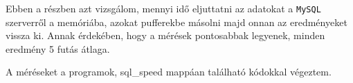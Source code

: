 


Ebben a részben azt vizsgálom, mennyi idő eljuttatni az adatokat a \texttt{MySQL} szerverről a memóriába, azokat pufferekbe másolni majd onnan az eredményeket vissza ki.
Annak érdekében, hogy a mérések pontosabbak legyenek, minden eredmény 5 futás átlaga.


A méréseket a programok, sql\_speed mappáan található kódokkal végeztem.

